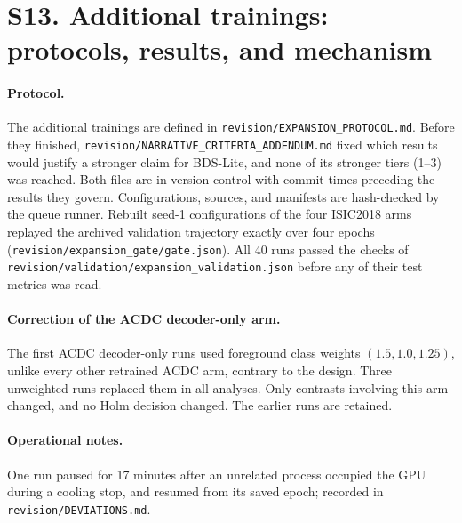 \documentclass[10pt]{article}
\begin{document}
\clearpage
\section*{S13. Additional trainings: protocols, results, and mechanism}
\paragraph{Protocol.} The additional trainings are defined in \texttt{revision/EXPANSION\_PROTOCOL.md}. Before they finished, \texttt{revision/NARRATIVE\_CRITERIA\_ADDENDUM.md} fixed which results would justify a stronger claim for BDS-Lite, and none of its stronger tiers (1--3) was reached. Both files are in version control with commit times preceding the results they govern. Configurations, sources, and manifests are hash-checked by the queue runner. Rebuilt seed-1 configurations of the four ISIC2018 arms replayed the archived validation trajectory exactly over four epochs (\texttt{revision/expansion\_gate/gate.json}). All 40 runs passed the checks of \texttt{revision/validation/expansion\_validation.json} before any of their test metrics was read.

\paragraph{Correction of the ACDC decoder-only arm.} The first ACDC decoder-only runs used foreground class weights $(1.5,1.0,1.25)$, unlike every other retrained ACDC arm, contrary to the design. Three unweighted runs replaced them in all analyses. Only contrasts involving this arm changed, and no Holm decision changed. The earlier runs are retained.

\paragraph{Operational notes.} One run paused for 17 minutes after an unrelated process occupied the GPU during a cooling stop, and resumed from its saved epoch; recorded in \texttt{revision/DEVIATIONS.md}.

\begin{table}[ht]\centering
\resizebox{\linewidth}{!}{}
\caption{Frozen contrasts on ISIC2018, all metrics. Positive favors the first arm, with distance differences negated. Holm correction over six contrasts within each metric on fresh seeds 4--10.}
\end{table}

\begin{table}[ht]\centering
\resizebox{\linewidth}{!}{}
\caption{Factorial and transfer-path effects on Boundary F1, seeds 1--3, with 95\% intervals. Interaction: $(\text{decoder+surface}-\text{decoder})-(\text{surface}-\text{U-Net})$. Pooled by inverse variance. DSC and HD95 for the central contrasts are in the main text; all metrics: \texttt{revision/tables/families/expansion\_interaction.csv}.}
\end{table}
\end{document}
